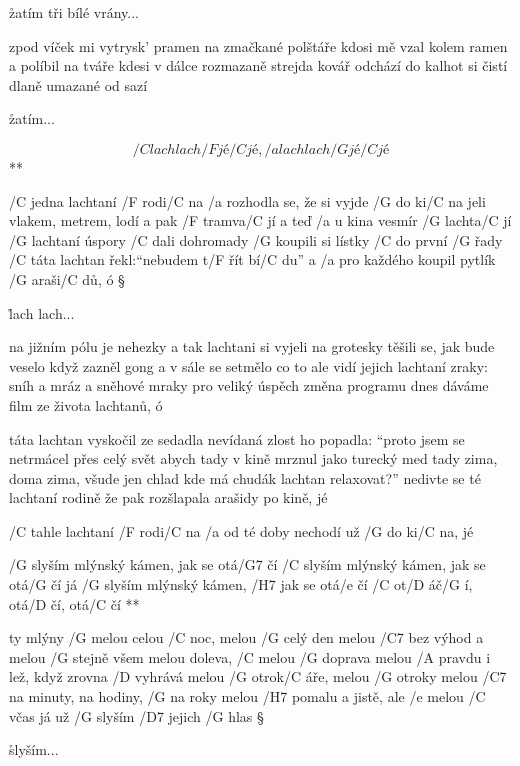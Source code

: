\r zatím tři bílé vrány...

zpod víček mi vytrysk' pramen na zmačkané polštáře
kdosi mě vzal kolem ramen a políbil na tváře
kdesi v dálce rozmazaně strejda kovář odchází
do kalhot si čistí dlaně umazané od sazí

\r zatím...




\R  \[ /C lach lach /F jé /C jé, /a lach lach /G jé /C jé \] **

/C jedna lachtaní /F rodi/C na
/a rozhodla se, že si vyjde /G do ki/C na
jeli vlakem, metrem, lodí a pak /F tramva/C jí
a teď /a u kina vesmír /G lachta/C jí
/G lachtaní úspory /C dali dohromady
/G koupili si lístky /C do první /G řady
/C táta lachtan řekl:``nebudem t/F řít bí/C du''
a /a pro každého koupil pytlík /G araši/C dů, ó \S

\r  lach lach...

na jižním pólu je nehezky
a tak lachtani si vyjeli na grotesky
těšili se, jak bude veselo
když zazněl gong a v sále se setmělo
co to ale vidí jejich lachtaní zraky:
sníh a mráz a sněhové mraky
pro veliký úspěch změna programu
dnes dáváme film ze života lachtanů, ó

\rr

táta lachtan vyskočil ze sedadla
nevídaná zlost ho popadla:
``proto jsem se netrmácel přes celý svět
abych tady v kině mrznul jako turecký med
tady zima, doma zima, všude jen chlad
kde má chudák lachtan relaxovat?''
nedivte se té lachtaní rodině
že pak rozšlapala arašidy po kině, jé

\rr

/C tahle lachtaní /F rodi/C na
/a od té doby nechodí už /G do ki/C na, jé




\R /G slyším mlýnský kámen, jak se otá/G7 čí
   /C slyším mlýnský kámen, jak se otá/G čí
   já /G slyším mlýnský kámen, /H7 jak se otá/e čí
   /C ot/D áč/G í, otá/D čí, otá/C čí **

ty mlýny /G melou celou /C noc, melou /G celý den
melou /C7 bez výhod a melou /G stejně všem
melou doleva, /C melou /G doprava
melou /A pravdu i lež, když zrovna /D vyhrává
melou /G otrok/C áře, melou /G otroky
melou /C7 na minuty, na hodiny, /G na roky
melou /H7 pomalu a jistě, ale /e melou /C včas
já už /G slyším /D7 jejich /G hlas \S

\r slyším...

